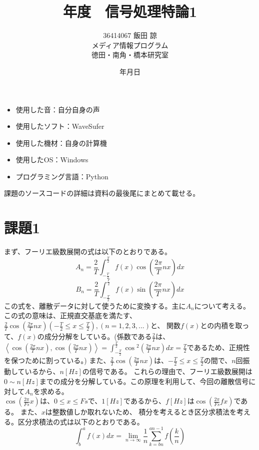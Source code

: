 \documentclass[a4j,11pt]{jarticle}
\title{{\number\year}年度　信号処理特論1}
\date{\number\year 年\number\month 月\number\day 日}
\author{36414067  飯田 諒 \\ メディア情報プログラム\\徳田・南角・橋本研究室}
\begin{document}
    \maketitle
    \thispagestyle{empty}
    \clearpage
    
    \begin{itemize}
        \item 使用した音：自分自身の声
        \item 使用したソフト：WaveSufer
        \item 使用した機材：自身の計算機
        \item 使用したOS：Windows
        \item プログラミング言語：Python
    \end{itemize}
    課題のソースコードの詳細は資料の最後尾にまとめて載せる。
    \section{課題1}
    まず、フーリエ級数展開の式は以下のとおりである。\\
    $$A_n = \frac 2 T \int _{-\frac T 2} ^{\frac T 2} f(x) \cos{\left( \frac {2\pi} T n x \right)} dx$$
    $$B_n = \frac 2 T \int _{-\frac T 2} ^{\frac T 2} f(x) \sin{\left( \frac {2\pi} T n x \right)} dx$$
    この式を、離散データに対して使うために変換する。主に$A_n$について考える。\\
    この式の意味は、正規直交基底を満たす、$\frac 2 T \cos{ \left( \frac {2\pi} T n x \right)} (-\frac T 2 \leq x \leq \frac T 2), (n = 1, 2, 3, ...)$と、
    関数$f(x)$との内積を取って、$f(x)$の成分分解をしている。(係数である$\frac 2 T$は、$\left< \cos{ \left( \frac {2\pi} T n x \right)},\cos{\left( \frac {2\pi} T n x \right)} \right> 
    = \int _{-\frac T 2} ^{\frac T 2} \cos{ ^2 \left( \frac {2\pi} T n x \right) } dx = \frac T 2$であるため、正規性を保つために割っている。)
    また、$\frac 2 T \cos{\left( \frac {2\pi} T n x \right)}$は、$-\frac T 2 \leq x \leq \frac T 2$の間で、$n$回振動しているから、$n[Hz]$の信号である。
    これらの理由で、フーリエ級数展開は$0 \sim n[Hz]$までの成分を分解している。この原理を利用して、今回の離散信号に対して$A_n$を求める。\\
    $\cos{ \left( \frac {2\pi} {Fs} x \right)}$は、$0 \leq x \leq Fs$で、$1[Hz]$であるから、$f[Hz]$は$\cos{ \left( \frac {2\pi} {Fs} f x \right)}$である。
    また、$x$は整数値しか取れないため、 積分を考えるとき区分求積法を考える。区分求積法の式は以下のとおりである。
    $$\int _b ^a f(x) dx = \lim _{n \to \infty} \frac 1 n \sum _{k = bn} ^{an-1} f\left(\frac k n\right)$$
\end{document}
